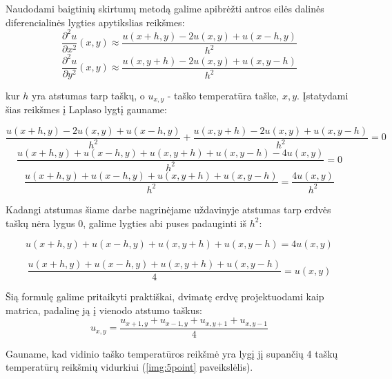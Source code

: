 \documentclass{VUMIFPSbakalaurinis}
\begin{document}
Naudodami baigtinių skirtumų metodą galime apibrėžti antros eilės dalinės diferencialinės lygties apytikslias reikšmes:
\begin{equation}
    \frac{∂^2 u}{∂ x^2}(x,y) \approx \frac{u(x+h,y)-2u(x,y)+u(x-h,y)}{h^2}
\end{equation}
\begin{equation}
    \frac{∂^2 u}{∂ y^2}(x,y) \approx \frac{u(x,y+h)-2u(x,y)+u(x,y-h)}{h^2}
\end{equation}

kur $h$ yra atstumas tarp taškų, o $u_{x,y}$ - taško temperatūra taške, $x,y$.  
Įstatydami šias reikšmes į Laplaso lygtį gauname:

\begin{equation}
    \frac{u(x+h,y)-2u(x,y)+u(x-h,y)}{h^2} +  \frac{u(x,y+h)-2u(x,y)+u(x,y-h)}{h^2}  = 0 
\end{equation}
\begin{equation}
    \frac{u(x+h,y)+u(x-h,y)+u(x,y+h)+u(x,y-h)-4u(x,y)}{h^2} = 0
\end{equation}
\begin{equation}
    \frac{u(x+h,y)+u(x-h,y)+u(x,y+h)+u(x,y-h)}{h^2} = \frac{4u(x,y)}{h^2}
\end{equation}

Kadangi atstumas šiame darbe nagrinėjame uždavinyje atstumas tarp erdvės taškų nėra lygus 0, galime lygties abi puses padauginti iš $h^2$:


\begin{equation}
    u(x+h,y)+u(x-h,y)+u(x,y+h)+u(x,y-h) = 4u(x,y)
\end{equation}

\begin{equation}
    \frac{u(x+h,y)+u(x-h,y)+u(x,y+h)+u(x,y-h)}{4} = u(x,y)
\end{equation}

Šią formulę galime pritaikyti praktiškai, dvimatę erdvę projektuodami kaip matrica, padalinę ją į vienodo atstumo taškus:
\begin{equation}
    u_{x, y} = \frac{u_{x+1,y}+u_{x-1,y}+u_{x,y+1}+u_{x,y-1}}{4}
\end{equation}

Gauname, kad vidinio taško temperatūros reikšmė yra lygį jį supančių 4 taškų temperatūrų reikšmių vidurkiui (\ref{img:5point} paveikslėlis). 
\end{document}
